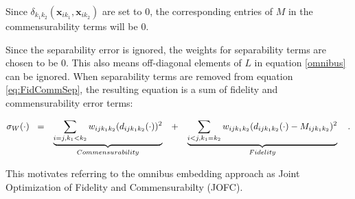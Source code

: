 \documentclass[12pt,oneside,final]{thesis}\usepackage[]{graphicx}\usepackage[]{color}
\begin{document}

Since ${ \delta_{k_1k_2}}(\bm{x}_{ik_1},\bm{x}_{ik_2}) $ are set to 0, the corresponding entries of $M$ in the commensurability terms will be 0.

Since    the separability error is ignored,  the weights for separability terms are chosen to be 0. This also means off-diagonal elements of $L$ in equation \eqref{omnibus} can be ignored. When separability terms are removed from equation \eqref{eq:FidCommSep}, the resulting equation  is a sum of fidelity and commensurability error terms:


\begin{align}
\sigma_W(\cdot)\hspace{3pt}   
\hspace{3pt}&=&\underbrace{\sum_{i=j,k_1< k_2}  {w_{ij{k_1}{k_2}}(d_{ij{k_1}{k_2}}(\cdot))^2}}_{Commensurability}  \hspace{10pt}  &  +&\underbrace{\sum_{i< j,k_1=k_2}  {w_{ij{k_1}{k_2}}(d_{ij{k_1}{k_2}}(\cdot)-M_{ijk_1k_2})^2  }  } _{Fidelity}\notag\label{eq:FidCommSep}\hspace{10pt} .
\end{align}

This motivates  referring to the omnibus embedding approach as Joint Optimization of Fidelity and Commensurabilty (JOFC).
\end{document}
